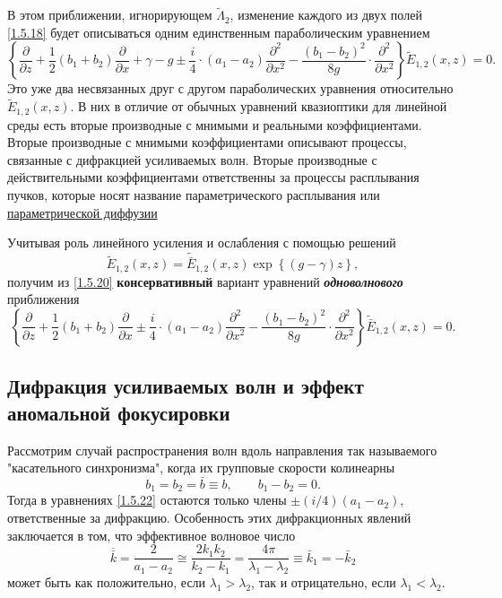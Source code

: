 \documentclass[a4paper]{article}
\begin{document}
	В этом приближении, игнорирующем $\tilde{\Lambda}_{2}$, изменение каждого из двух полей \eqref{1.5.18} будет описываться одним единственным параболическим уравнением 
	\begin{equation}
		\left\{\frac{\partial}{\partial z}+\frac{1}{2}(b_{1}+b_{2})\frac{\partial}{\partial x}+\gamma-g\pm\frac{i}{4}\cdot(a_{1}-a_{2})\frac{\partial^{2}}{\partial x^{2}}-\frac{(b_{1}-b_{2})^{2}}{8g}\cdot\frac{\partial^{2}}{\partial x^{2}}\right\}\tilde{E}_{1,2}(x,z)=0.
		\label{1.5.20}
	\end{equation}
	Это уже два несвязанных друг с другом параболических уравнения относительно $\tilde{E}_{1,2}(x,z)$. В них в отличие от обычных уравнений квазиоптики для линейной среды есть вторые производные с мнимыми и реальными коэффициентами. Вторые производные с мнимыми коэффициентами описывают процессы, связанные с дифракцией усиливаемых волн. Вторые производные с действительными коэффициентами ответственны за процессы расплывания пучков, которые носят название параметрического расплывания или \underline{параметрической диффузии}
	
	Учитывая роль линейного усиления и ослабления с помощью решений 
	\begin{equation}
		\tilde{E}_{1,2}(x,z)=\tilde{\bar{E}}_{1,2}(x,z)\exp\left\{(g-\gamma)z\right\},
		\label{1.5.21}
	\end{equation}
	получим из \eqref{1.5.20} \textbf{консервативный} вариант уравнений \textbf{\textit{одноволнового}} приближения 
	\begin{equation}
		\left\{\frac{\partial}{\partial z}+\frac{1}{2}(b_{1}+b_{2})\frac{\partial}{\partial x}\pm\frac{i}{4}\cdot(a_{1}-a_{2})\frac{\partial^{2}}{\partial x^{2}}-\frac{(b_{1}-b_{2})^{2}}{8g}\cdot\frac{\partial^{2}}{\partial x^{2}}\right\}\tilde{\bar{E}}_{1,2}(x,z)=0.
		\label{1.5.22}
	\end{equation}
	\subsection{Дифракция усиливаемых волн и эффект аномальной фокусировки}
Рассмотрим случай распространения волн вдоль направления так называемого "касательного синхронизма", когда их групповые скорости колинеарны
\begin{equation}
	b_{1}=b_{2}=\bar{b}\equiv b,\qquad b_{1}-b_{2}=0.
	\label{1.5.23}
\end{equation}
Тогда в уравнениях \eqref{1.5.22} остаются только члены $\pm(i/4)(a_{1}-a_{2})$, ответственные за дифракцию. Особенность этих дифракционных явлений заключается в том, что эффективное волновое число 
\begin{equation}
	\overline{\bar{k}}=\frac{2}{a_{1}-a_{2}}\cong\frac{2k_{1}k_{2}}{k_{2}-k_{1}}=\frac{4\pi}{\lambda_{1}-\lambda_{2}}\equiv\bar{k}_{1}=-\bar{k}_{2}
	\label{1.5.24}
\end{equation}
может быть как положительно, если  $\lambda_{1}>\lambda_{2}$, так и отрицательно, если  $\lambda_{1}<\lambda_{2}$.
\end{document}
